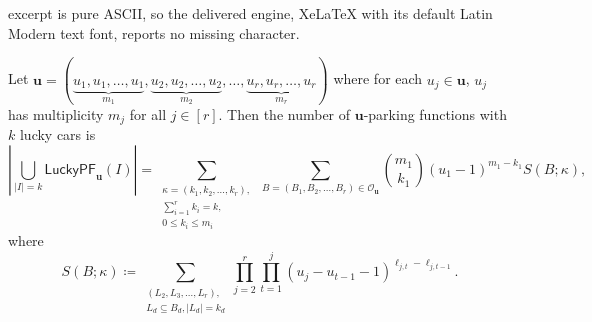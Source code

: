 \documentclass[10pt,a4paper]{amsart}
\newcommand{\LPF}{\mathsf{LuckyPF}}
\newcommand{\bsy}{\boldsymbol}
\newcommand{\out}{\mathcal{O}}
\begin{document}
excerpt is pure ASCII, so the delivered engine, XeLaTeX with its default Latin Modern text font, reports no missing character.
\begin{theorem}\label{thm:countforupfs}
Let $\bsy{u}=(\underbrace{u_1,u_1,\ldots, u_1}_{m_1}, \underbrace{u_2,u_2,\ldots, u_2}_{m_2}, \ldots, \underbrace{u_r,u_r,\ldots ,u_r}_{m_r})$ where for each $u_j\in \bsy{u}$, $u_j$ has multiplicity $m_j$ for all $j\in [r]$. Then the number of $\bsy{u}$-parking functions with $k$ lucky cars is
\[ 
\left|\bigcup_{|I|=k} \LPF_{\bsy{u}}(I)\right| = 
\sum_{{\substack{\kappa = (k_1,k_2,\ldots, k_r), \\
\sum_{i=1}^{r}k_i=k,\\
0\leq k_i\leq m_i}}}
\,\sum_{{B = (B_1,B_2,\ldots, B_r) \in \out_{\bsy u}}}\binom{m_1}{k_1}(u_1-1)^{m_1-k_1} S(B ; \kappa),
\]
where
\[S(B;\kappa) \coloneq \sum_{{\substack{(L_2,L_3,\ldots,L_r), \\ L_d\subseteq B_d, |L_d|=k_d}}}\prod_{j=2}^r \prod_{t=1}^{j} (u_{j}-u_{t-1}-1)^{\ell_{j,t}-\ell_{j,t-1}}.\]

\end{theorem}
\end{document}
